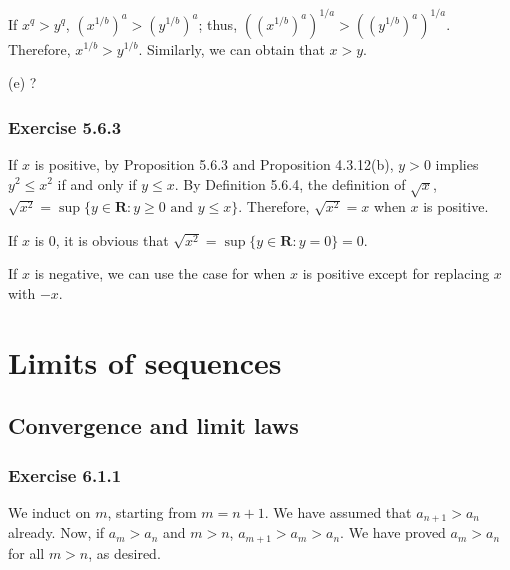 \documentclass[12pt, oneside]{book}
\begin{document}
	If $x^q > y^q$, $(x^{1 / b})^a > (y^{1 / b})^a$; thus, $((x^{1 / b})^a)^{1 / a} > ((y^{1 / b})^a)^{1 / a}$. Therefore, $x^{1 / b} > y^{1 / b}$. Similarly, we can obtain that $x > y$.
	
	\bigskip
	\noindent (e) ?
	
	\subsection*{Exercise 5.6.3}
	
	If $x$ is positive, by Proposition 5.6.3 and Proposition 4.3.12(b), $y > 0$ implies $y^2 \le x^2$ if and only if $y \le x$. By Definition 5.6.4, the definition of $\sqrt{x}$, $\sqrt{x^2} = \sup \{y \in \mathbf{R}: y \ge 0 \text{ and } y \le x\}$. Therefore, $\sqrt{x^2} = x$ when $x$ is positive.
	
	If $x$ is $0$, it is obvious that $\sqrt{x^2} = \sup \{y \in \mathbf{R}: y = 0\} = 0$.
	
	If $x$ is negative, we can use the case for when $x$ is positive except for replacing $x$ with $-x$.
	
	\chapter{Limits of sequences}
	
	\section{Convergence and limit laws}
	
	\subsection*{Exercise 6.1.1}
	
	We induct on $m$, starting from $m = n + 1$. We have assumed that $a_{n + 1} > a_n$ already. Now, if $a_m > a_n$ and $m > n$, $a_{m + 1} > a_m > a_n$. We have proved $a_m > a_n$ for all $m > n$, as desired.
	
\end{document}
